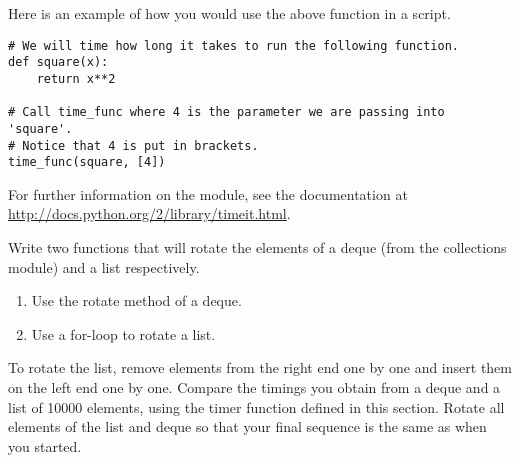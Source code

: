 Here is an example of how you would use the above function in a script.

\begin{lstlisting}
# We will time how long it takes to run the following function.
def square(x):
    return x**2

# Call time_func where 4 is the parameter we are passing into 'square'.
# Notice that 4 is put in brackets.
time_func(square, [4])
\end{lstlisting}

For further information on the  module, see the documentation at \url{http://docs.python.org/2/library/timeit.html}.


\begin{problem}
Write two functions that will rotate the elements of a deque (from the collections module) and a list respectively.
\begin{enumerate}
\item Use the rotate method of a deque.
\item Use a for-loop to rotate a list.
\end{enumerate}

To rotate the list, remove elements from the right end one by one and insert them on the left end one by one.
Compare the timings you obtain from a deque and a list of 10000 elements, using the timer function defined in this section. Rotate all elements of the list and deque so that your final sequence is the same as when you started.
\end{problem}






